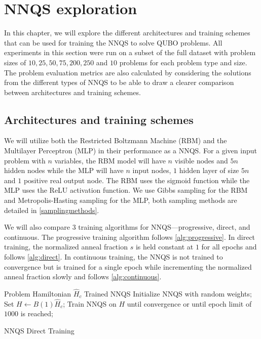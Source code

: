 \chapter{NNQS exploration}\label{nnqsresults}
In this chapter, we will explore the different architectures and training schemes that can be used for training the NNQS to solve QUBO problems. All experiments in this section were run on a subset of the full dataset with problem sizes of $10,25,50,75,200,250$ and $10$ problems for each problem type and size. The problem evaluation metrics are also calculated by considering the solutions from the different types of NNQS to be able to draw a clearer comparison between architectures and training schemes.

\section{Architectures and training schemes}
We will utilize both the Restricted Boltzmann Machine (RBM) and the Multilayer Perceptron (MLP) in their performance as a NNQS. For a given input problem with $n$ variables, the RBM model will have $n$ visible nodes and $5n$ hidden nodes while the MLP will have $n$ input nodes, $1$ hidden layer of size $5n$ and $1$ positive real output node. The RBM uses the sigmoid function while the MLP uses the ReLU activation function. We use Gibbs sampling for the RBM and Metropolis-Hasting sampling for the MLP, both sampling methods are detailed in \autoref{samplingmethods}.

We will also compare 3 training algorithms for NNQS---progressive, direct, and continuous. The progressive training algorithm follows \autoref{alg:progressive}. In direct training, the normalized anneal fraction $s$ is held constant at $1$ for all epochs and follows \autoref{alg:direct}.  In continuous training, the NNQS is not trained to convergence but is trained for a single epoch while incrementing the normalized anneal fraction slowly and follows \autoref{alg:continuous}.

\begin{algorithm}
    \begin{algorithmic}
    \Require Problem Hamiltonian $\hat{H}_c$
    \Ensure Trained NNQS
    \State Initialize NNQS with random weights;
    \State Set $H \leftarrow B(1)\hat{H}_c$;
    \State Train NNQS on $H$ until convergence or until epoch limit of $1000$ is reached;
    \end{algorithmic}
    \caption{NNQS Direct Training}
    \label{alg:direct}
\end{algorithm}

